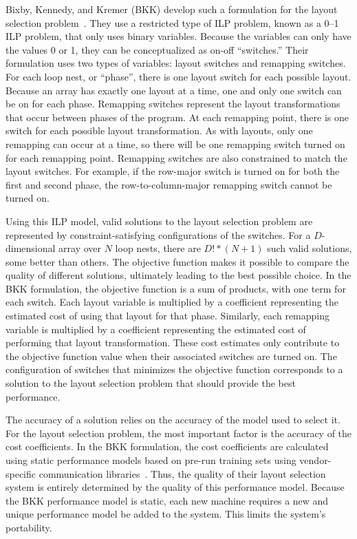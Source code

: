 Bixby, Kennedy, and Kremer (BKK) develop such a formulation for the layout selection problem~\cite{bixby1994automatic,kennedy1995automatic,kennedy1998automatic}.
They use a restricted type of ILP problem, known as a 0--1 ILP problem, that only uses binary variables.
Because the variables can only have the values 0 or 1, they can be conceptualized as on-off ``switches.''
Their formulation uses two types of variables: layout switches and remapping switches.
For each loop nest, or ``phase'', there is one layout switch for each possible layout.
Because an array has exactly one layout at a time, one and only one switch can be on for each phase.
Remapping switches represent the layout transformations that occur between phases of the program.
At each remapping point, there is one switch for each possible layout transformation.
As with layouts, only one remapping can occur at a time, so there will be one remapping switch turned on for each remapping point.
Remapping switches are also constrained to match the layout switches.
For example, if the row-major switch is turned on for both the first and second phase, the row-to-column-major remapping switch cannot be turned on.

Using this ILP model, valid solutions to the layout selection problem are represented by constraint-satisfying configurations of the switches.
For a $D$-dimensional array over $N$ loop nests, there are $D!*(N+1)$ such valid solutions, some better than others.
The objective function makes it possible to compare the quality of different solutions, ultimately leading to the best possible choice.
In the BKK formulation, the objective function is a sum of products, with one term for each switch.
Each layout variable is multiplied by a coefficient representing the estimated cost of using that layout for that phase.
Similarly, each remapping variable is multiplied by a coefficient representing the estimated cost of performing that layout transformation.
These cost estimates only contribute to the objective function value when their associated switches are turned on.
The configuration of switches that minimizes the objective function corresponds to a solution to the layout selection problem that should provide the best performance.

The accuracy of a solution relies on the accuracy of the model used to select it.
For the layout selection problem, the most important factor is the accuracy of the cost coefficients.
In the BKK formulation, the cost coefficients are calculated using static performance models based on pre-run training sets using vendor-specific communication libraries~\cite{kremer1996automatic}.
Thus, the quality of their layout selection system is entirely determined by the quality of this performance model.
Because the BKK performance model is static, each new machine requires a new and unique performance model be added to the system.
This limits the system's portability.

